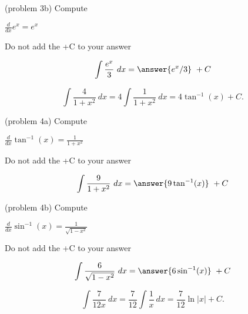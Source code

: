 \documentclass[handout]{ximera}
\begin{document}
\begin{problem}(problem 3b)
Compute

\begin{hint}
$\frac{d}{dx} e^x = e^x$
\end{hint}
\begin{hint}
\begin{center}
Do not add the +C to your answer
\end{center}
\end{hint}

\[
\int \frac{e^x}{3} \ dx =
\answer{e^x /3} \ +  C
\]
\end{problem}


\begin{example}[example 4]
\[
\int \frac{4}{1+x^2} \ dx = 4 \int \frac{1}{1+x^2} \ dx = 4\tan^{-1}(x) +C.
\]
\end{example}



\begin{problem}(problem 4a)
Compute

\begin{hint}
$\frac{d}{dx} \tan^{-1}(x) = \frac{1}{1+x^2}$
\end{hint}
\begin{hint}
\begin{center}
Do not add the +C to your answer
\end{center}
\end{hint}

\[
\int \frac{9}{1+x^2} \ dx =
\answer{9\tan^{-1}(x)} \ +  C
\]
\end{problem}

\begin{problem}(problem 4b)
Compute

\begin{hint}
$\frac{d}{dx} \sin^{-1}(x) = \frac{1}{\sqrt{1-x^2}}$
\end{hint}
\begin{hint}
\begin{center}
Do not add the +C to your answer
\end{center}
\end{hint}

\[
\int \frac{6}{\sqrt{1-x^2}} \ dx =
\answer{6\sin^{-1}(x)} \ +  C
\]
\end{problem}


\begin{example}[example 5]
\[
\int \frac{7}{12x} \ dx = \frac{7}{12} \int \frac{1}{x} \ dx = \frac{7}{12} \ln|x| +C.
\]
\end{example}
\end{document}
